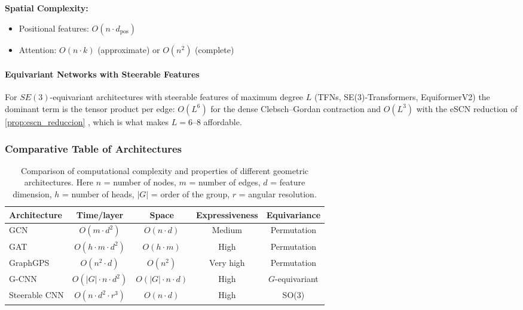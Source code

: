 \textbf{Spatial Complexity:}
\begin{itemize}
\item Positional features: $O(n \cdot d_{\text{pos}})$
\item Attention: $O(n \cdot k)$ (approximate) or $O(n^2)$ (complete)
\end{itemize}

\paragraph{Equivariant Networks with Steerable Features}

For $SE(3)$-equivariant architectures with steerable features of maximum degree $L$ (TFNs, SE(3)-Transformers, EquiformerV2) the dominant term is the tensor product per edge: $O(L^6)$ for the dense Clebsch--Gordan contraction and $O(L^3)$ with the eSCN reduction of \autoref{prop:escn_reduccion} \citep{passaro2023escn}, which is what makes $L = 6$--$8$ affordable.

\subsubsection{Comparative Table of Architectures}

\begin{table}[h]
\centering
\begin{tabular}{l|c|c|c|c}
\toprule
\textbf{Architecture} & \textbf{Time/layer} & \textbf{Space} & \textbf{Expressiveness} & \textbf{Equivariance} \\
\midrule
GCN & $O(m \cdot d^2)$ & $O(n \cdot d)$ & Medium & Permutation \\
GAT & $O(h \cdot m \cdot d^2)$ & $O(h \cdot m)$ & High & Permutation \\
GraphGPS & $O(n^2 \cdot d)$ & $O(n^2)$ & Very high & Permutation \\
G-CNN & $O(|G| \cdot n \cdot d^2)$ & $O(|G| \cdot n \cdot d)$ & High & $G$-equivariant \\
Steerable CNN & $O(n \cdot d^2 \cdot r^3)$ & $O(n \cdot d)$ & High & SO(3) \\
\bottomrule
\end{tabular}
\caption[Computational complexity of geometric architectures]{Comparison of computational complexity and properties of different geometric architectures. Here $n$ = number of nodes, $m$ = number of edges, $d$ = feature dimension, $h$ = number of heads, $|G|$ = order of the group, $r$ = angular resolution.}
\label{tab:complejidad_arquitecturas_geometricas}
\end{table}


